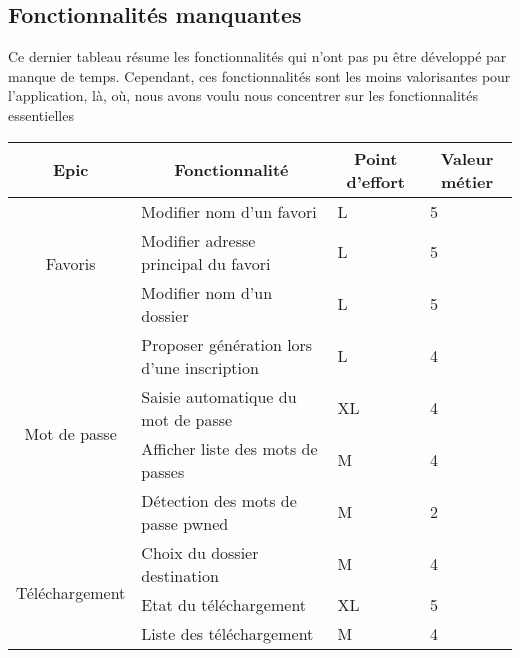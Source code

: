 \documentclass[10pt,a4paper]{article}
\begin{document}
\subsection{Fonctionnalités manquantes}
Ce dernier tableau résume les fonctionnalités qui n'ont pas pu être développé par manque de temps. Cependant, ces fonctionnalités sont les moins valorisantes pour l'application, là, où, nous avons voulu nous concentrer sur les fonctionnalités essentielles
\begin{table}[h]
\begin{tabular}{|c|l|l|l|}
\hline
\textbf{Epic}            & \multicolumn{1}{c|}{\textbf{Fonctionnalité}} & \multicolumn{1}{c|}{\textbf{Point d'effort}} & \multicolumn{1}{c|}{\textbf{Valeur métier}} \\ \hline
\multirow{3}{*}{Favoris} & Modifier nom d'un favori                     & L                                            & 5 \\ \cline{2-4} 
                         & Modifier adresse principal du favori         & L                                            & 5                                           \\ \cline{2-4} 
                         & Modifier nom d'un dossier                    & L                                            & 5                                           \\ \hline
\multirow{4}{*}{Mot de passe}           & Proposer génération lors d'une inscription   & L                                            & 4                                          \\ \cline{2-4} 
                                        & Saisie automatique du mot de passe           & XL                                           & 4                                           \\ \cline{2-4} 
                                        & Afficher liste des mots de passes            & M                                            & 4                                           \\ \cline{2-4} 
                                        & Détection des mots de passe pwned            & M                                            & 2                                           \\ \hline
\multirow{3}{*}{Téléchargement}         & Choix du dossier destination                 & M                                            & 4                                           \\ \cline{2-4} 
                                        & Etat du téléchargement                       & XL                                           & 5                                           \\ \cline{2-4} 
                                        & Liste des téléchargement                     & M                                            & 4                                           \\ \hline
\end{tabular}
\end{table}
\end{document}
